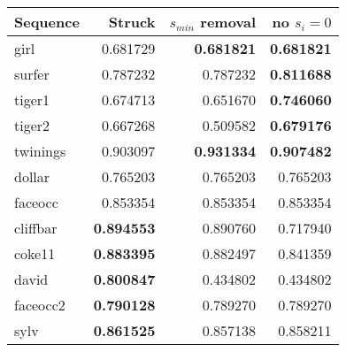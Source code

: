 \begin{tabular}{l r r r}
    \toprule
    Sequence & Struck & \(s_{min}\) removal & no \(s_i = 0\) \\
    \midrule

    girl     &         0.681729  & \textbf{0.681821} & \textbf{0.681821} \\
    surfer   &         0.787232  &         0.787232  & \textbf{0.811688} \\
    tiger1   &         0.674713  &         0.651670  & \textbf{0.746060} \\
    tiger2   &         0.667268  &         0.509582  & \textbf{0.679176} \\
    twinings &         0.903097  & \textbf{0.931334} & \textbf{0.907482} \\
    dollar   &         0.765203  &         0.765203  &         0.765203  \\
    faceocc  &         0.853354  &         0.853354  &         0.853354  \\
    cliffbar & \textbf{0.894553} &         0.890760  &         0.717940  \\
    coke11   & \textbf{0.883395} &         0.882497  &         0.841359  \\
    david    & \textbf{0.800847} &         0.434802  &         0.434802  \\
    faceocc2 & \textbf{0.790128} &         0.789270  &         0.789270  \\
    sylv     & \textbf{0.861525} &         0.857138  &         0.858211  \\
    \bottomrule
\end{tabular}
